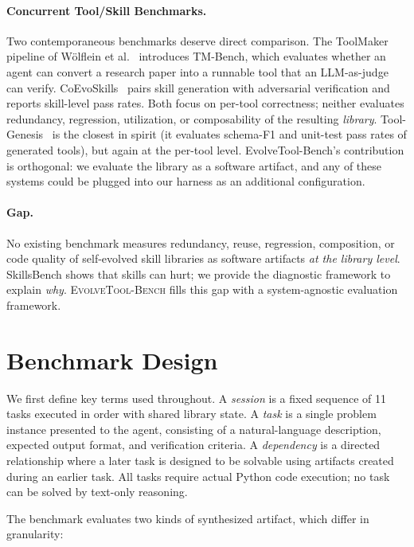 \documentclass[sigplan,nonacm,natbib=false]{acmart}
\begin{document}
\paragraph{Concurrent Tool/Skill Benchmarks.} Two contemporaneous benchmarks deserve direct comparison. The ToolMaker pipeline of W{\"o}lflein et al.~\cite{wolflein2025toolmaker} introduces TM-Bench, which evaluates whether an agent can convert a research paper into a runnable tool that an LLM-as-judge can verify. CoEvoSkills~\cite{zhang2026coevoskills} pairs skill generation with adversarial verification and reports skill-level pass rates. Both focus on per-tool correctness; neither evaluates redundancy, regression, utilization, or composability of the resulting \emph{library}. Tool-Genesis~\cite{xia2026toolgenesis} is the closest in spirit (it evaluates schema-F1 and unit-test pass rates of generated tools), but again at the per-tool level. EvolveTool-Bench's contribution is orthogonal: we evaluate the library as a software artifact, and any of these systems could be plugged into our harness as an additional configuration.

\paragraph{Gap.} No existing benchmark measures redundancy, reuse, regression, composition, or code quality of self-evolved skill libraries as software artifacts \emph{at the library level}. SkillsBench shows that skills can hurt; we provide the diagnostic framework to explain \emph{why}. \textsc{EvolveTool-Bench} fills this gap with a system-agnostic evaluation framework.

\section{Benchmark Design}

We first define key terms used throughout. A \emph{session} is a fixed sequence of 11 tasks executed in order with shared library state. A \emph{task} is a single problem instance presented to the agent, consisting of a natural-language description, expected output format, and verification criteria. A \emph{dependency} is a directed relationship where a later task is designed to be solvable using artifacts created during an earlier task. All tasks require actual Python code execution; no task can be solved by text-only reasoning.

The benchmark evaluates two kinds of synthesized artifact, which differ in granularity:
\end{document}
